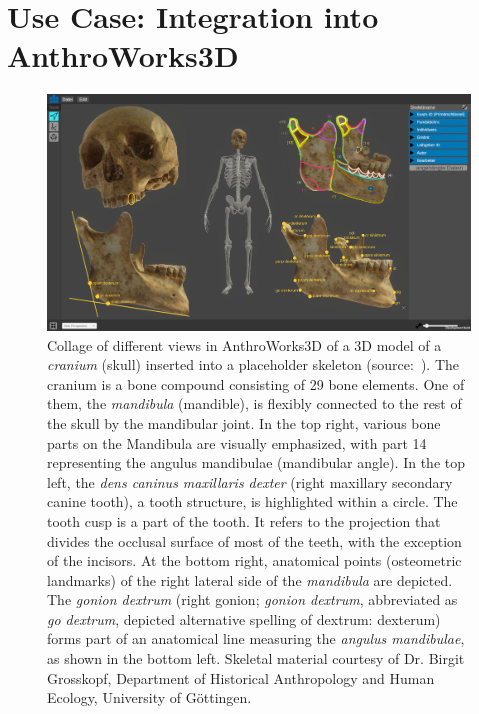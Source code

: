 \documentclass[sw]{iosart2x}
\newcommand{\aw}{AnthroWorks3D}
\begin{document}
\section{Use Case: Integration into \aw{}}\label{sec:aw}


\begin{figure}[h]
\includegraphics[width=\textwidth]{img/aw3d.png}
\caption{
Collage of different views in \aw{} of a 3D model of a \emph{cranium} (skull) inserted into a placeholder skeleton (source:~\cite{aw3dcidoc}).
The cranium is a bone compound consisting of 29 bone elements.
One of them, the \emph{mandibula} (mandible), is flexibly connected to the rest of the skull by the mandibular joint.
In the top right, various bone parts on the Mandibula are visually emphasized, with part 14 representing the angulus mandibulae (mandibular angle).
In the top left, the \emph{dens caninus maxillaris dexter} (right maxillary secondary canine tooth), a tooth structure, is highlighted within a circle.
The tooth cusp is a part of the tooth.
It refers to the projection that divides the occlusal surface of most of the teeth, with the exception of the incisors.
At the bottom right, anatomical points (osteometric landmarks) of the right lateral side of the \emph{mandibula} are depicted.
The \emph{gonion dextrum} (right gonion; \emph{gonion dextrum}, abbreviated as \emph{go dextrum}, depicted alternative spelling of dextrum: dexterum) forms part of an anatomical line measuring the \emph{angulus mandibulae},
as shown in the bottom left.
Skeletal material courtesy of Dr. Birgit Grosskopf, Department of Historical Anthropology and Human Ecology, University of Göttingen.
}
\label{fig:aw}
\end{figure}
\end{document}
